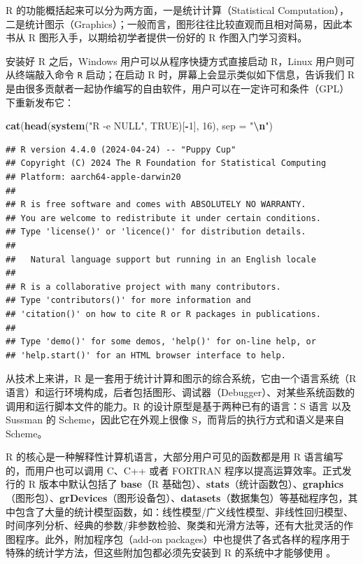 \documentclass[
  b5paper,
  UTF8,twoside]{book}
\newenvironment{Shaded}{\begin{snugshade}}{\end{snugshade}}
\newcommand{\AttributeTok}[1]{\textcolor[rgb]{0.13,0.29,0.53}{#1}}
\newcommand{\ConstantTok}[1]{\textcolor[rgb]{0.56,0.35,0.01}{#1}}
\newcommand{\DecValTok}[1]{\textcolor[rgb]{0.00,0.00,0.81}{#1}}
\newcommand{\FunctionTok}[1]{\textcolor[rgb]{0.13,0.29,0.53}{\textbf{#1}}}
\newcommand{\NormalTok}[1]{#1}
\newcommand{\SpecialCharTok}[1]{\textcolor[rgb]{0.81,0.36,0.00}{\textbf{#1}}}
\newcommand{\StringTok}[1]{\textcolor[rgb]{0.31,0.60,0.02}{#1}}
\begin{document}
R 的功能概括起来可以分为两方面，一是统计计算（Statistical Computation），二是统计图示（Graphics）；一般而言，图形往往比较直观而且相对简易，因此本书从 R 图形入手，以期给初学者提供一份好的 R 作图入门学习资料。

安装好 R 之后，Windows 用户可以从程序快捷方式直接启动 R，Linux 用户则可从终端敲入命令 \texttt{R} 启动；在启动 R 时，屏幕上会显示类似如下信息，告诉我们 R 是由很多贡献者一起协作编写的自由软件，用户可以在一定许可和条件（GPL）下重新发布它：

\begin{Shaded}
\begin{Highlighting}[]
\FunctionTok{cat}\NormalTok{(}\FunctionTok{head}\NormalTok{(}\FunctionTok{system}\NormalTok{(}\StringTok{"R {-}e NULL"}\NormalTok{, }\ConstantTok{TRUE}\NormalTok{)[}\SpecialCharTok{{-}}\DecValTok{1}\NormalTok{], }\DecValTok{16}\NormalTok{), }\AttributeTok{sep =} \StringTok{"}\SpecialCharTok{\textbackslash{}n}\StringTok{"}\NormalTok{)}
\end{Highlighting}
\end{Shaded}

\begin{verbatim}
## R version 4.4.0 (2024-04-24) -- "Puppy Cup"
## Copyright (C) 2024 The R Foundation for Statistical Computing
## Platform: aarch64-apple-darwin20
## 
## R is free software and comes with ABSOLUTELY NO WARRANTY.
## You are welcome to redistribute it under certain conditions.
## Type 'license()' or 'licence()' for distribution details.
## 
##   Natural language support but running in an English locale
## 
## R is a collaborative project with many contributors.
## Type 'contributors()' for more information and
## 'citation()' on how to cite R or R packages in publications.
## 
## Type 'demo()' for some demos, 'help()' for on-line help, or
## 'help.start()' for an HTML browser interface to help.
\end{verbatim}

从技术上来讲，R 是一套用于统计计算和图示的综合系统，它由一个语言系统（R 语言）和运行环境构成，后者包括图形、调试器（Debugger）、对某些系统函数的调用和运行脚本文件的能力。R 的设计原型是基于两种已有的语言：S 语言 \citep{Becker88} 以及 Sussman 的 Scheme，因此它在外观上很像 S，而背后的执行方式和语义是来自 Scheme。

R 的核心是一种解释性计算机语言，大部分用户可见的函数都是用 R 语言编写的，而用户也可以调用 C、C++ 或者 FORTRAN 程序以提高运算效率。正式发行的 R 版本中默认包括了 \textbf{base}（R 基础包）、\textbf{stats}（统计函数包）、\textbf{graphics}（图形包）、\textbf{grDevices}（图形设备包）、\textbf{datasets}（数据集包）等基础程序包，其中包含了大量的统计模型函数，如：线性模型/广义线性模型、非线性回归模型、时间序列分析、经典的参数/非参数检验、聚类和光滑方法等，还有大批灵活的作图程序。此外，附加程序包（add-on
packages）中也提供了各式各样的程序用于特殊的统计学方法，但这些附加包都必须先安装到 R 的系统中才能够使用 \citep{Hornik-FAQ}。
\end{document}
